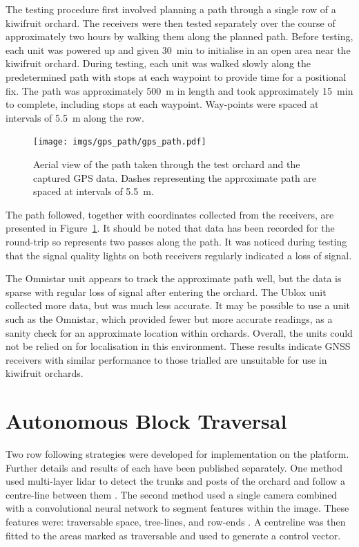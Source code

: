 \documentclass[preprint,authoryear,12pt]{elsarticle}
\begin{document}
        The testing procedure first involved planning a path through a single row of a kiwifruit orchard.
        The receivers were then tested separately over the course of approximately two hours by walking them along the planned path.
        Before testing, each unit was powered up and given \SI{30}{\minute} to initialise in an open area near the kiwifruit orchard.
        During testing, each unit was walked slowly along the predetermined path with stops at each waypoint to provide time for a positional fix.
        The path was approximately \SI{500}{\meter} in length and took approximately \SI{15}{\minute} to complete, including stops at each waypoint.
        Way-points were spaced at intervals of \SI{5.5}{\meter} along the row.

        \begin{figure}[htb]
            \centering
            \texttt{[image: imgs/gps\_path/gps\_path.pdf]}
            \caption{
                Aerial view of the path taken through the test orchard and the captured GPS data.
                Dashes representing the approximate path are spaced at intervals of \SI{5.5}{\meter}.
            }
            \label{fig:gpsResults}
        \end{figure}

        The path followed, together with coordinates collected from the receivers, are presented in Figure~\ref{fig:gpsResults}.
        It should be noted that data has been recorded for the round-trip so represents two passes along the path.
        It was noticed during testing that the signal quality lights on both receivers regularly indicated a loss of signal.

        The Omnistar unit appears to track the approximate path well, but the data is sparse with regular loss of signal after entering the orchard.
        The Ublox unit collected more data, but was much less accurate.
        It may be possible to use a unit such as the Omnistar, which provided fewer but more accurate readings, as a sanity check for an approximate location within orchards.
        Overall, the units could not be relied on for localisation in this environment.
        These results indicate GNSS receivers with similar performance to those trialled are unsuitable for use in kiwifruit orchards.


\section{Autonomous Block Traversal}
\label{sect:autonomous}
    Two row following strategies were developed for implementation on the platform.
    Further details and results of each have been published separately.
    One method used multi-layer lidar to detect the trunks and posts of the orchard and follow a centre-line between them \citep{Bell2016}.
    The second method used a single camera combined with a convolutional neural network to segment features within the image.
    These features were: traversable space, tree-lines, and row-ends \citep{Bell2017}.
    A centreline was then fitted to the areas marked as traversable and used to generate a control vector.
\end{document}
